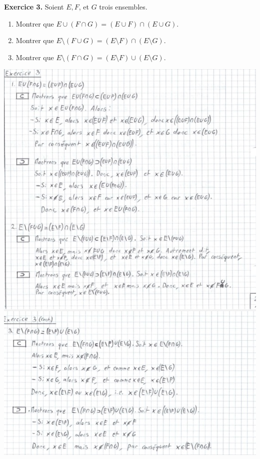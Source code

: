 \documentclass[a4paper, 10pt]{report}
\begin{document}
	\newpage

	\noindent
	\textbf{Exercice 3.} Soient $E, F$, et $G$ trois ensembles.
	
	\begin{enumerate}[label=\arabic*.]
		\item Montrer que $E \cup (F \cap G)
			= (E \cup F) \cap (E \cup G)$.
		\item Montrer que $E \setminus (F \cup G)
			= (E \setminus F) \cap (E \setminus G)$.
		\item Montrer que $E \setminus (F \cap G)
		= (E \setminus F) \cup (E \setminus G)$.
	\end{enumerate}
	
	
	\includegraphics[scale=0.9]{02B - ex03.jpg}
	
\end{document}
